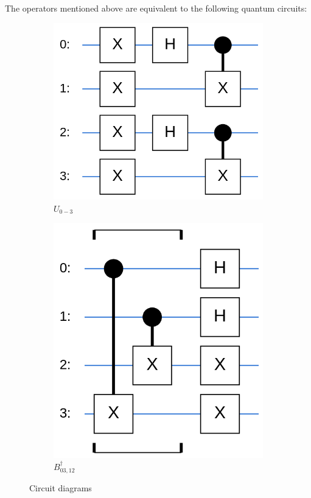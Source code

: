 \documentclass[a4paper,11pt,aps,tightenlines,nofootinbib]{revtex4}
\begin{document}
        The operators mentioned above are equivalent to the following quantum circuits:
        \begin{figure}[h!]
                \begin{subfigure}[b]{.3\textwidth}
                \includegraphics[scale=.3]{images/qtet_state_prep.png}
                \caption{$U_{0-3}$}
                \end{subfigure}
                \begin{subfigure}[b]{.3\textwidth}
                \includegraphics[scale=.3]{images/inv_bell_state.png}
                \caption{$B^\dagger_{03,12}$}
                \end{subfigure}
                \caption{Circuit diagrams \cite{cirq}}
        \end{figure}
\end{document}
